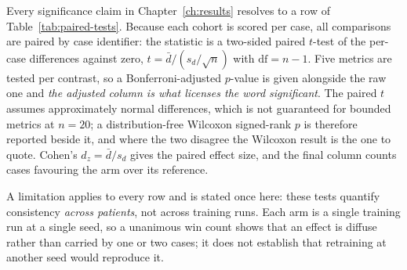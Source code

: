 Every significance claim in Chapter~\ref{ch:results} resolves to a row of
Table~\ref{tab:paired-tests}. Because each cohort is scored per case, all comparisons are
paired by case identifier: the statistic is a two-sided paired $t$-test of the per-case
differences against zero, $t=\bar d/(s_d/\sqrt n)$ with $\mathrm{df}=n-1$. Five metrics are
tested per contrast, so a Bonferroni-adjusted $p$-value is given alongside the raw one and
\emph{the adjusted column is what licenses the word significant}. The paired $t$ assumes
approximately normal differences, which is not guaranteed for bounded metrics at $n=20$; a
distribution-free Wilcoxon signed-rank $p$ is therefore reported beside it, and where the two
disagree the Wilcoxon result is the one to quote. Cohen's $d_z=\bar d/s_d$ gives the paired
effect size, and the final column counts cases favouring the arm over its reference.

A limitation applies to every row and is stated once here: these tests quantify consistency
\emph{across patients}, not across training runs. Each arm is a single training run at a
single seed, so a unanimous win count shows that an effect is diffuse rather than carried by
one or two cases; it does not establish that retraining at another seed would reproduce it.



%
%
